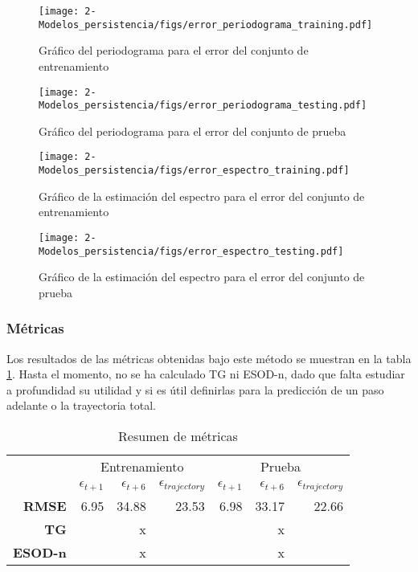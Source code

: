 \begin{figure}[H]
	\centering
	\texttt{[image: 2-Modelos\_persistencia/figs/error\_periodograma\_training.pdf]}
	\caption{Gráfico del periodograma para el error del conjunto de entrenamiento}
	\label{fig:M2_error_periodograma_train}
\end{figure}

\begin{figure}[H]
	\centering
	\texttt{[image: 2-Modelos\_persistencia/figs/error\_periodograma\_testing.pdf]}
	\caption{Gráfico del periodograma para el error del conjunto de prueba}
	\label{fig:M2_error_periodograma_test}
\end{figure}

\begin{figure}[H]
	\centering
	\texttt{[image: 2-Modelos\_persistencia/figs/error\_espectro\_training.pdf]}
	\caption{Gráfico de la estimación del espectro para el error del conjunto de entrenamiento}
	\label{fig:M2_error_espectro_train}
\end{figure}

\begin{figure}[H]
	\centering
	\texttt{[image: 2-Modelos\_persistencia/figs/error\_espectro\_testing.pdf]}
	\caption{Gráfico de la estimación del espectro para el error del conjunto de prueba}
	\label{fig:M2_error_espectro_test}
\end{figure}

\subsubsection*{Métricas}

Los resultados de las métricas obtenidas bajo este método se muestran en la tabla \ref{table:M2_metricas}. Hasta el momento, no se ha calculado TG ni ESOD-n, dado que falta estudiar a profundidad su utilidad y si es útil definirlas para la predicción de un paso adelante o la trayectoria total.

\begin{table}[H]
	\centering
	\begin{tabular}{rrrr|rrr}
		\hline \hline
		& \multicolumn{3}{c|}{Entrenamiento} & \multicolumn{3}{c}{Prueba} \\
		& $\epsilon_{t+1}$ & $\epsilon_{t+6}$ &$\epsilon_{trajectory}$ & $\epsilon_{t+1}$  & $\epsilon_{t+6}$ & $\epsilon_{trajectory}$ \\ \hline
		\textbf{RMSE}   & 6.95 & 34.88 & 23.53 & 6.98 & 33.17 & 22.66 \\
		\textbf{TG}     &      & x     &       &      & x     &       \\
		\textbf{ESOD-n} &      & x     &       &      & x     &       \\ 
		\hline \hline
	\end{tabular}
	\caption{Resumen de métricas}
	\label{table:M2_metricas}
\end{table}




